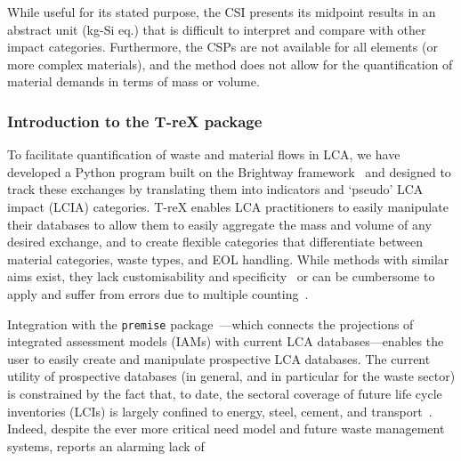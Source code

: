 While useful for its stated purpose, the CSI presents its midpoint results in an abstract unit (kg-Si eq.) that is difficult to interpret and compare with other impact categories. Furthermore, the CSPs are not available for all elements (or more complex materials), and the method does not allow for the quantification of material demands in terms of mass or volume.

\subsubsection{Introduction to the T-reX package}

To facilitate quantification of waste and material flows in LCA, we have developed a Python program built on the Brightway framework~\citep{mutel2017brightway} and designed to track these exchanges by translating them into indicators and `pseudo' LCA impact (LCIA) categories. T-reX enables LCA practitioners to easily manipulate their databases to allow them to easily aggregate the mass and volume of any desired exchange, and to create flexible categories that differentiate between material categories, waste types, and EOL handling. While methods with similar aims exist, they lack customisability and specificity~\citep{foen2021ecofactors} or can be cumbersome to apply and suffer from errors due to multiple counting~\citep{laurenti2023wastefootprint}.


Integration with the \texttt{premise} package~\citep{sacchi2022premise}---which connects the projections of integrated assessment models (IAMs) with current LCA databases---enables the user to easily create and manipulate prospective LCA databases. The current utility of prospective databases (in general, and in particular for the waste sector) is constrained by the fact that, to date, the sectoral coverage of future life cycle inventories (LCIs) is largely confined to energy, steel, cement, and transport~\citep{sacchi2023premisedocs}. Indeed, despite the ever more critical need model and future waste management systems, \cite{bisinella2024wastelca} reports an alarming lack of 




